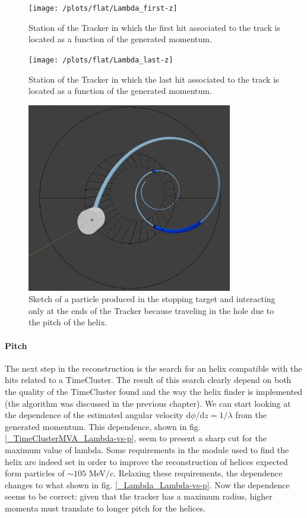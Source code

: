 \documentclass[12pt,a4paper,openright, oneside, titlepage]{book} %
\begin{document}
\begin{figure}[h!]
\centering
\texttt{[image: /plots/flat/Lambda\_first-z]}
\caption{Station of the Tracker in which the first hit associated to the track is located as a function of the generated momentum.}
\label{_Lambda_first-z}
\end{figure}

\begin{figure}[!htb]
\centering
\texttt{[image: /plots/flat/Lambda\_last-z]}
\caption{Station of the Tracker in which the last hit associated to the track is located as a function of the generated momentum.}
\label{_Lambda_last-z}
\end{figure}

\begin{figure}[!htb]
\centering
\includegraphics[width =0.8\textwidth, keepaspectratio]{Blender_Tracker_4}
\caption{Sketch of a particle produced in the stopping target and interacting only at the ends of the Tracker because traveling in the hole due to the pitch of the helix.}
\label{_blender}
\end{figure}

\paragraph{Pitch}
The next step in the reconstruction is the search for an helix compatible with the hits related to a TimeCluster.
The result of this search clearly depend on both the quality of the TimeCluster found and the way the helix finder is implemented (the algorithm was discussed in the previous chapter). 
We can start looking at the dependence of the estimated angular velocity $\mathrm{d}\phi/\mathrm{d}z = 1/ \lambda$ from the generated momentum. 
This dependence, shown in fig. \ref{_TimeClusterMVA_Lambda-vs-p}, seem to present a sharp cut for the maximum value of lambda.  
Some requirements in the module used to find the helix are indeed set in order to improve the reconstruction of helices expected form particles of $\sim 105$ MeV$/c$. Relaxing these requirements, the dependence changes to what shown in fig. \ref{_Lambda_Lambda-vs-p}. Now the dependence seems to be correct: given that the tracker has a maximum radius, higher momenta must translate to longer pitch for the helices.\\
\end{document}
